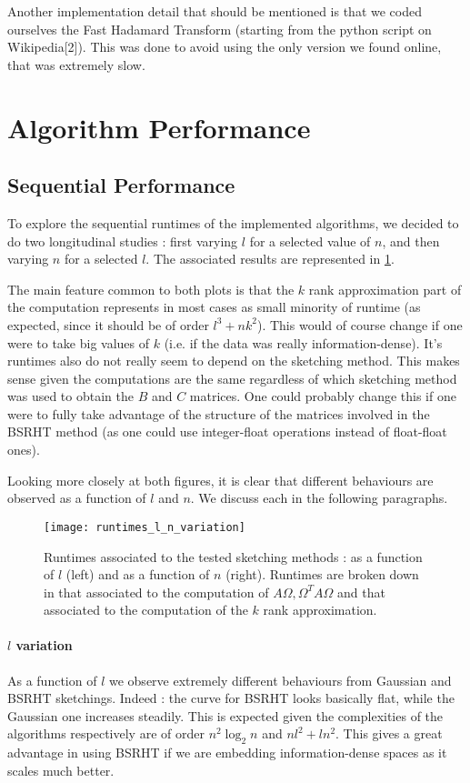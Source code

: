 \documentclass[a4paper, 12pt,oneside]{article}
\begin{document}
		Another implementation detail that should be mentioned is that we coded ourselves the Fast Hadamard Transform (starting from the python script on Wikipedia[2]). This was done to avoid using the only version we found online, that was extremely slow.
		\section{Algorithm Performance}
        \subsection{Sequential Performance}
		To explore the sequential runtimes of the implemented algorithms, we decided to do two longitudinal studies : first varying $l$ for a selected value of $n$, and then varying $n$ for a selected $l$. The associated results are represented in \ref{fig:runtimes-l-n-variation}. 

		The main feature common to both plots is that the $k$ rank approximation part of the computation represents in most cases as small minority of runtime (as expected, since it should be of order $l^3 +nk^2$). This would of course change if one were to take big values of $k$ (i.e. if the data was really information-dense).  	
		It's runtimes also do not really seem to depend on the sketching method. This makes sense given the computations are the same regardless of which sketching method was used to obtain the $B$ and $C$ matrices. One could probably change this if one were to fully take advantage of the structure of the matrices involved in the BSRHT method (as one could use integer-float operations instead of float-float ones). 

		Looking more closely at both figures, it is clear that different behaviours are observed as a function of $l$ and $n$. We discuss each in the following paragraphs.
		\begin{figure}[htb]       
			\centering             
				\vspace{0em}
				\texttt{[image: runtimes\_l\_n\_variation]}
				\caption{Runtimes associated to the tested sketching methods : as a function of $l$ (left) and as a function of $n$ (right). Runtimes are broken down in that associated to the computation of $A\Omega,\Omega^T A\Omega$ and that associated to the computation of the $k$ rank approximation.}
				\label{fig:runtimes-l-n-variation}
		\end{figure}
		\paragraph{$l$ variation}
		As a function of $l$ we observe extremely different behaviours from Gaussian and BSRHT sketchings. Indeed : the curve for BSRHT looks basically flat, while the Gaussian one increases steadily. This is expected given the complexities of the algorithms respectively are of order $n^2\log_2{n}$ and $nl^2 + ln^2$. This gives a great advantage in using BSRHT if we are embedding information-dense spaces as it scales much better.		
\end{document}
